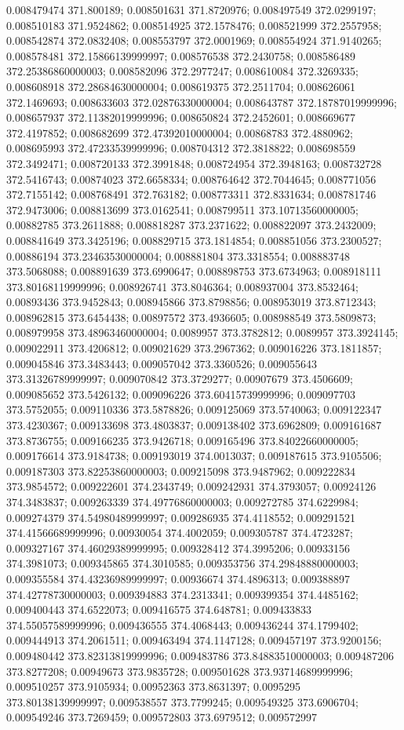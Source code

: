 0.008479474 371.800189; 0.008501631 371.8720976; 0.008497549 372.0299197; 0.008510183 371.9524862; 0.008514925 372.1578476; 0.008521999 372.2557958; 0.008542874 372.0832408; 0.008553797 372.0001969; 0.008554924 371.9140265; 0.008578481 372.15866139999997; 0.008576538 372.2430758; 0.008586489 372.25386860000003; 0.008582096 372.2977247; 0.008610084 372.3269335; 0.008608918 372.28684630000004; 0.008619375 372.2511704; 0.008626061 372.1469693; 0.008633603 372.02876330000004; 0.008643787 372.18787019999996; 0.008657937 372.11382019999996; 0.008650824 372.2452601; 0.008669677 372.4197852; 0.008682699 372.47392010000004; 0.00868783 372.4880962; 0.008695993 372.47233539999996; 0.008704312 372.3818822; 0.008698559 372.3492471; 0.008720133 372.3991848; 0.008724954 372.3948163; 0.008732728 372.5416743; 0.00874023 372.6658334; 0.008764642 372.7044645; 0.008771056 372.7155142; 0.008768491 372.763182; 0.008773311 372.8331634; 0.008781746 372.9473006; 0.008813699 373.0162541; 0.008799511 373.10713560000005; 0.00882785 373.2611888; 0.008818287 373.2371622; 0.008822097 373.2432009; 0.008841649 373.3425196; 0.008829715 373.1814854; 0.008851056 373.2300527; 0.00886194 373.23463530000004; 0.008881804 373.3318554; 0.008883748 373.5068088; 0.008891639 373.6990647; 0.008898753 373.6734963; 0.008918111 373.80168119999996; 0.008926741 373.8046364; 0.008937004 373.8532464; 0.00893436 373.9452843; 0.008945866 373.8798856; 0.008953019 373.8712343; 0.008962815 373.6454438; 0.00897572 373.4936605; 0.008988549 373.5809873; 0.008979958 373.48963460000004; 0.0089957 373.3782812; 0.0089957 373.3924145; 0.009022911 373.4206812; 0.009021629 373.2967362; 0.009016226 373.1811857; 0.009045846 373.3483443; 0.009057042 373.3360526; 0.009055643 373.31326789999997; 0.009070842 373.3729277; 0.00907679 373.4506609; 0.009085652 373.5426132; 0.009096226 373.60415739999996; 0.009097703 373.5752055; 0.009110336 373.5878826; 0.009125069 373.5740063; 0.009122347 373.4230367; 0.009133698 373.4803837; 0.009138402 373.6962809; 0.009161687 373.8736755; 0.009166235 373.9426718; 0.009165496 373.84022660000005; 0.009176614 373.9184738; 0.009193019 374.0013037; 0.009187615 373.9105506; 0.009187303 373.82253860000003; 0.009215098 373.9487962; 0.009222834 373.9854572; 0.009222601 374.2343749; 0.009242931 374.3793057; 0.00924126 374.3483837; 0.009263339 374.49776860000003; 0.009272785 374.6229984; 0.009274379 374.54980489999997; 0.009286935 374.4118552; 0.009291521 374.41566689999996; 0.00930054 374.4002059; 0.009305787 374.4723287; 0.009327167 374.46029389999995; 0.009328412 374.3995206; 0.00933156 374.3981073; 0.009345865 374.3010585; 0.009353756 374.29848880000003; 0.009355584 374.43236989999997; 0.00936674 374.4896313; 0.009388897 374.42778730000003; 0.009394883 374.2313341; 0.009399354 374.4485162; 0.009400443 374.6522073; 0.009416575 374.648781; 0.009433833 374.55057589999996; 0.009436555 374.4068443; 0.009436244 374.1799402; 0.009444913 374.2061511; 0.009463494 374.1147128; 0.009457197 373.9200156; 0.009480442 373.82313819999996; 0.009483786 373.84883510000003; 0.009487206 373.8277208; 0.00949673 373.9835728; 0.009501628 373.93714689999996; 0.009510257 373.9105934; 0.00952363 373.8631397; 0.0095295 373.80138139999997; 0.009538557 373.7799245; 0.009549325 373.6906704; 0.009549246 373.7269459; 0.009572803 373.6979512; 0.009572997 